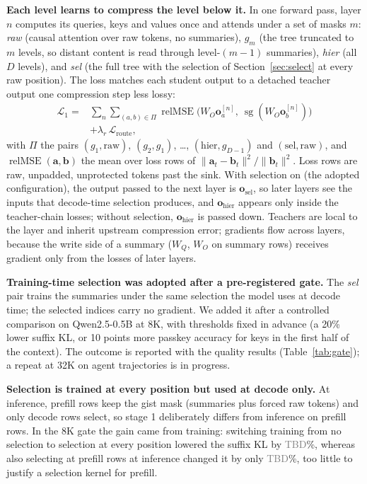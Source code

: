 \documentclass[10pt,twocolumn]{article}
\newcommand{\para}[1]{\noindent\textbf{#1}\hspace{0.5em}}
\newcommand{\tbd}{\textcolor{gray}{TBD}}
\newcommand{\sg}{\operatorname{sg}}
\newcommand{\relmse}{\operatorname{relMSE}}
\begin{document}
\para{Each level learns to compress the level below it.}
In one forward pass, layer $n$ computes its queries, keys and values once and attends under a
set of masks $m$: \textit{raw} (causal attention over raw tokens, no summaries), $g_m$ (the
tree truncated to $m$ levels, so distant content is read through level-$(m-1)$ summaries),
\textit{hier} (all $D$ levels), and \textit{sel} (the full tree with the selection of
Section~\ref{sec:select} at every raw position). The loss matches each student output to a
detached teacher output one compression step less lossy:
\begin{equation}
\begin{aligned}
  \mathcal{L}_1 = {}&\sum_{n}\sum_{(a,b)\in\Pi}
     \relmse\bigl(W_O\mathbf{o}^{[n]}_a,\ \sg(W_O\mathbf{o}^{[n]}_b)\bigr)\\
     &+ \lambda_r\,\mathcal{L}_{\text{route}},
\end{aligned}
  \label{eq:stage1}
\end{equation}
with $\Pi$ the pairs $(g_1,\text{raw})$, $(g_2,g_1)$, \dots, $(\text{hier},g_{D-1})$ and
$(\text{sel},\text{raw})$, and $\relmse(\mathbf{a},\mathbf{b})$ the mean over loss rows of
$\|\mathbf{a}_t-\mathbf{b}_t\|^2/\|\mathbf{b}_t\|^2$. Loss rows are raw, unpadded, unprotected
tokens past the sink. With selection on (the adopted configuration), the output passed to the
next layer is $\mathbf{o}_{\text{sel}}$, so later layers see the inputs that decode-time selection
produces, and $\mathbf{o}_{\text{hier}}$ appears only inside the teacher-chain losses; without
selection, $\mathbf{o}_{\text{hier}}$ is passed down. Teachers are local to the layer and inherit
upstream compression error; gradients flow
across layers, because the write side of a summary ($W_Q$, $W_O$ on summary rows) receives
gradient only from the losses of later layers.

\para{Training-time selection was adopted after a pre-registered gate.}
The \textit{sel} pair trains the summaries under the same selection the model uses at decode
time; the selected indices carry no gradient. We added it after a controlled comparison on
Qwen2.5-0.5B at 8K, with thresholds fixed in advance (a 20\% lower suffix KL, or 10 points
more passkey accuracy for keys in the first half of the context). The outcome is reported
with the quality results (Table~\ref{tab:gate}); a repeat at 32K on agent trajectories is in
progress.

\para{Selection is trained at every position but used at decode only.}
At inference, prefill rows keep the gist mask (summaries plus forced raw tokens) and only
decode rows select, so stage 1 deliberately differs from inference on prefill rows. In the 8K
gate the gain came from training: switching training from no selection to selection at every
position lowered the suffix KL by \tbd\%, whereas also selecting at prefill rows at inference
changed it by only \tbd\%, too little to justify a selection kernel for prefill.
\end{document}

